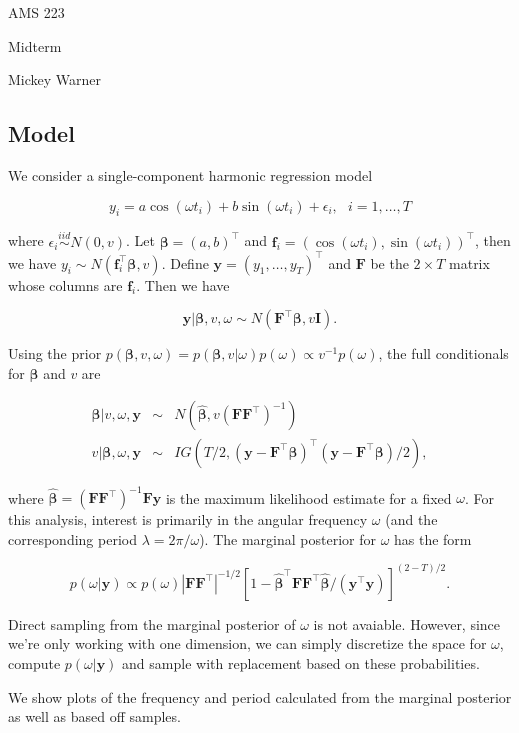 \documentclass[12pt]{article}
\newcommand{\m}[1]{\mathbf{\bm{#1}}}
\begin{document}
\noindent AMS 223

\noindent Midterm

\noindent Mickey Warner

\subsection*{Model}

\noindent We consider a single-component harmonic regression model

\[ y_i = a\cos(\omega t_i) + b\sin(\omega t_i) +\epsilon_i,~~~i=1,\ldots,T \]

\noindent where $\epsilon_i\overset{iid}{\sim}N(0,v)$. Let $\m{\beta}=(a,b)^\top$ and $\m{f}_i=(\cos(\omega t_i), \sin(\omega t_i))^\top$, then we have $y_i\sim N(\m{f}_i^\top \m{\beta}, v)$. Define $\m{y}=(y_1,\ldots,y_T)^\top$ and $\m{F}$ be the $2\times T$ matrix whose columns are $\m{f}_i$. Then we have

\[ \m{y}|\m{\beta},v,\omega \sim N\left(\m{F}^\top \m{\beta}, v\m{I}\right). \]

\noindent Using the prior $p(\m{\beta},v,\omega)=p(\m{\beta},v|\omega)p(\omega) \propto v^{-1}p(\omega)$, the full conditionals for $\m{\beta}$ and $v$ are

\begin{eqnarray*}
\m{\beta}|v,\omega,\m{y} &\sim& N\left(\hat{\m{\beta}}, v(\m{F}\m{F}^\top)^{-1}\right)  \\
v|\m{\beta},\omega,\m{y} &\sim& IG\left(T/2, (\m{y}-\m{F}^\top\m{\beta})^\top(\m{y}-\m{F}^\top\m{\beta})/2\right),
\end{eqnarray*}

\noindent where $\hat{\m{\beta}}=(\m{F}\m{F}^\top)^{-1}\m{F}\m{y}$ is the maximum likelihood estimate for a fixed $\omega$. For this analysis, interest is primarily in the angular frequency $\omega$ (and the corresponding period $\lambda=2\pi/\omega$). The marginal posterior for $\omega$ has the form

\[ p(\omega|\m{y}) \propto p(\omega)\left|\m{F}\m{F}^\top\right|^{-1/2}\left[1-\hat{\m{\beta}}^\top\m{F}\m{F}^\top\hat{\m{\beta}}/(\m{y}^\top\m{y})\right]^{(2-T)/2}. \]

\noindent Direct sampling from the marginal posterior of $\omega$ is not avaiable. However, since we're only working with one dimension, we can simply discretize the space for $\omega$, compute $p(\omega|\m{y})$ and sample with replacement based on these probabilities.
\bigskip

\noindent We show plots of the frequency and period calculated from the marginal posterior as well as based off samples.
\end{document}
